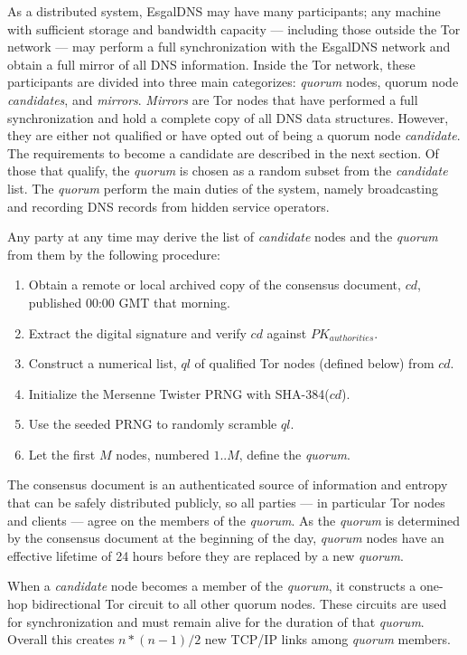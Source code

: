 As a distributed system, EsgalDNS may have many participants; any machine with sufficient storage and bandwidth capacity --- including those outside the Tor network --- may perform a full synchronization with the EsgalDNS network and obtain a full mirror of all DNS information. Inside the Tor network, these participants are divided into three main categorizes: \emph{quorum} nodes, quorum node \emph{candidates}, and \emph{mirrors}. \emph{Mirrors} are Tor nodes that have performed a full synchronization and hold a complete copy of all DNS data structures. However, they are either not qualified or have opted out of being a quorum node \emph{candidate}. The requirements to become a candidate are described in the next section. Of those that qualify, the \emph{quorum} is chosen as a random subset from the \emph{candidate} list. The \emph{quorum} perform the main duties of the system, namely broadcasting and recording DNS records from hidden service operators. 

Any party at any time may derive the list of \emph{candidate} nodes and the \emph{quorum} from them by the following procedure:

\begin{enumerate}
	\item Obtain a remote or local archived copy of the consensus document, $ cd $, published 00:00 GMT that morning.
	\item Extract the digital signature and verify $ cd $ against $ PK_{authorities} $.
	\item Construct a numerical list, $ ql $ of qualified Tor nodes (defined below) from $ cd $.
	\item Initialize the Mersenne Twister PRNG with SHA-384($ cd $).
	\item Use the seeded PRNG to randomly scramble $ ql $.
	\item Let the first $ M $ nodes, numbered $ 1 .. M $, define the \emph{quorum}.
\end{enumerate}

The consensus document is an authenticated source of information and entropy that can be safely distributed publicly, so all parties --- in particular Tor nodes and clients --- agree on the members of the \emph{quorum}. As the \emph{quorum} is determined by the consensus document at the beginning of the day, \emph{quorum} nodes have an effective lifetime of 24 hours before they are replaced by a new \emph{quorum}.

When a \emph{candidate} node becomes a member of the \emph{quorum}, it constructs a one-hop bidirectional Tor circuit to all other quorum nodes. These circuits are used for synchronization and must remain alive for the duration of that \emph{quorum}. Overall this creates $ n * (n - 1) / 2 $ new TCP/IP links among \emph{quorum} members.

